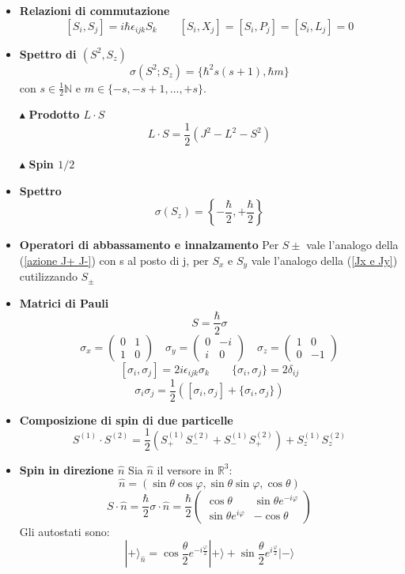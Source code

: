 \documentclass{book}
\newcommand{\g}{\textbf}
\newcommand{\e}{\begin{equation}}
\newcommand{\ex}{\end{equation} }
\renewcommand{\it}{\item[$\cdot$]}
\begin{document}
\begin{multicols}{4}
\begin{itemize}
    \it \g{Relazioni di commutazione}
        \e{[S_i, S_j] = i\hbar \epsilon_{ijk} S_k \qquad [S_{i},X_{j}] = [S_{i}, P_{j}] = [S_{i}, L_{j}] = 0} \ex
    \it \g{Spettro di $(S^2, S_z)$}
        \e{\sigma(S^2; S_z) = \{\hbar^2 s(s+1), \hbar m\}} \ex
        con $s \in \frac{1}{2} \mathbb{N}$ e $m \in \{-s, -s + 1, \dots, +s\}$.
\item [$\blacktriangle$] \g{Prodotto $L \cdot S$}
    \e{L \cdot S = \frac{1}{2} \left(J^2 - L^2 - S^2\right)} \ex
\item [$\blacktriangle$] \g{Spin $1/2$}
    \it \g{Spettro}
        \e{\sigma(S_z) = \left\{-\frac{\hbar}{2}, +\frac{\hbar}{2}\right\}} \ex
         \it\g{Operatori di abbassamento e innalzamento}
         Per $S{\pm}$ vale l'analogo della (\ref{azione J+ J-}) con s al posto di j, per $S_{x}$ e $S_{y}$ vale l'analogo della (\ref{Jx e Jy}) cutilizzando $S_{\pm}$
  \it\g{Matrici di Pauli}
    \e{S = \frac{\hbar}{2} \sigma} \ex
    \e{\sigma_x = 
    \begin{pmatrix}
        0 & 1 \\
        1 & 0
    \end{pmatrix} \quad \sigma_y = 
    \begin{pmatrix}
        0 & -i \\
        i & 0
    \end{pmatrix} \quad \sigma_z = 
    \begin{pmatrix}
        1 & 0 \\
        0 & -1
    \end{pmatrix}} \ex
    \e{[\sigma_i, \sigma_j] = 2i \epsilon_{ijk} \sigma_k \qquad \{\sigma_i, \sigma_j\} = 2\delta_{ij}} \ex
    \e{\sigma_i \sigma_j = \frac{1}{2} \left([\sigma_i, \sigma_j] + \{\sigma_i, \sigma_j\}\right)} \ex
\it \g{Composizione di spin di due particelle}
    \e{S^{(1)} \cdot S^{(2)} = \frac{1}{2}\left(S^{(1)}_+ S^{(2)}_- + S^{(1)}_- S^{(2)}_+\right) + S^{(1)}_z S^{(2)}_z} \ex
\it \g{Spin in direzione $\hat{n}$}        
    Sia $\hat{n}$ il versore in $\mathbb{R}^3$:
    \e{\hat{n} = (\sin\theta\cos\varphi, \sin\theta\sin\varphi, \cos\theta)} \ex
    \e{S \cdot \hat{n} = \frac{\hbar}{2} \sigma \cdot \hat{n} = \frac{\hbar}{2}
    \begin{pmatrix}
        \cos\theta & \sin\theta e^{-i\varphi} \\
        \sin\theta e^{i\varphi} & -\cos\theta
    \end{pmatrix}} \ex
    Gli autostati sono:
    \e{|+\rangle_{\hat{n}} = \cos\frac{\theta}{2} e^{-i\frac{\varphi}{2}} |+\rangle + \sin\frac{\theta}{2} e^{i\frac{\varphi}{2}} |-\rangle} \ex

\end{itemize}
\end{multicols}
\end{document}
